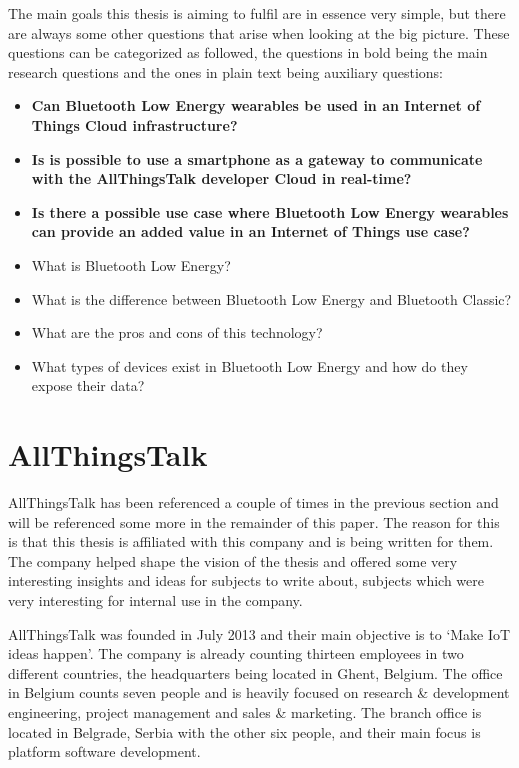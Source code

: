 \documentclass[pdftex,a4paper,12pt,twoside]{report}
\begin{document}
The main goals this thesis is aiming to fulfil are in essence very simple, but there are always some other questions that arise when looking at the big picture. These questions can be categorized as followed, the questions in bold being the main research questions and the ones in plain text being auxiliary questions:
\begin{itemize}
	\item{\textbf{Can Bluetooth Low Energy wearables be used in an Internet of Things Cloud infrastructure?}}
	\item{\textbf{Is is possible to use a smartphone as a gateway to communicate with the AllThingsTalk developer Cloud in real-time?}}
	\item{\textbf{Is there a possible use case where Bluetooth Low Energy wearables can provide an added value in an Internet of Things use case?}}
	\item{What is Bluetooth Low Energy?}
	\item{What is the difference between Bluetooth Low Energy and Bluetooth Classic?}
	\item{What are the pros and cons of this technology?}
	\item{What types of devices exist in Bluetooth Low Energy and how do they expose their data?}
\end{itemize}

\section{AllThingsTalk}
\label{sec:allthingstalk}
AllThingsTalk has been referenced a couple of times in the previous section and will be referenced some more in the remainder of this paper. The reason for this is that this thesis is affiliated with this company and is being written for them. The company helped shape the vision of the thesis and offered some very interesting insights and ideas for subjects to write about, subjects which were very interesting for internal use in the company.

AllThingsTalk was founded in July 2013 and their main objective is to `Make IoT ideas happen'. The company is already counting thirteen employees in two different countries, the headquarters being located in Ghent, Belgium. The office in Belgium counts seven people and is heavily focused on research \& development engineering, project management and sales \& marketing. The branch office is located in Belgrade, Serbia with the other six people, and their main focus is platform software development.
\end{document}
